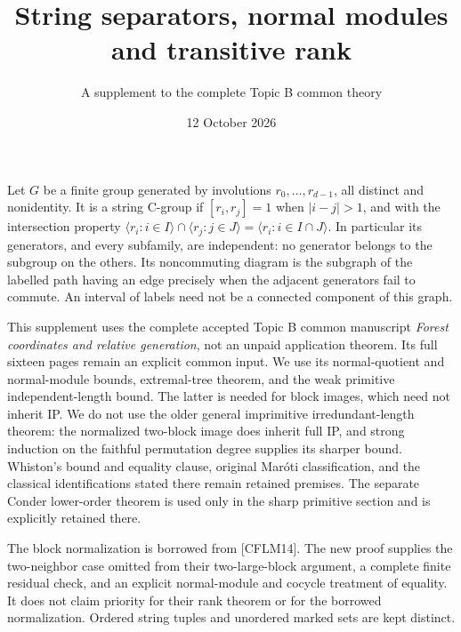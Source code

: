 \documentclass[11pt]{article}
\title{String separators, normal modules and transitive rank}
\author{A supplement to the complete Topic B common theory}
\date{12 October 2026}
\newcommand{\gen}[1]{\langle#1\rangle}\newcommand{\F}{\mathbb F}
\begin{document}
\maketitle
Let $G$ be a finite group generated by involutions
$r_0,\ldots,r_{d-1}$, all distinct and nonidentity. It is a string C-group
if $[r_i,r_j]=1$ when $|i-j|>1$,
and with the intersection property
$\gen{r_i:i\in I}\cap\gen{r_j:j\in J}=\gen{r_i:i\in I\cap J}$.
In particular its generators, and every subfamily, are independent:
no generator belongs to the subgroup on the others. Its noncommuting
diagram is the subgraph of the labelled path having an edge precisely
when the adjacent generators fail to commute. An interval of labels
need not be a connected component of this graph.

This supplement uses the complete accepted Topic B common manuscript
\emph{Forest coordinates and relative generation},
not an unpaid application theorem. Its full sixteen pages remain an
explicit common input. We use its normal-quotient and normal-module
bounds, extremal-tree theorem, and the weak primitive independent-length
bound. The latter is needed for block images, which need not inherit IP.
We do not use the older general imprimitive irredundant-length theorem:
the normalized two-block image does inherit full IP, and strong induction
on the faithful permutation degree supplies its sharper bound.
Whiston's bound and equality clause, original Mar\'oti classification,
and the classical identifications stated there remain retained premises.
The separate Conder lower-order theorem is used only in the sharp
primitive section and is explicitly retained there.

The block normalization is borrowed from [CFLM14]. The new proof supplies the two-neighbor case omitted
from their two-large-block argument, a complete finite residual check,
and an explicit normal-module and cocycle treatment of equality.
It does not claim priority for their rank theorem or for the borrowed
normalization. Ordered string tuples and unordered marked sets are
kept distinct.





\appendix
\end{document}
